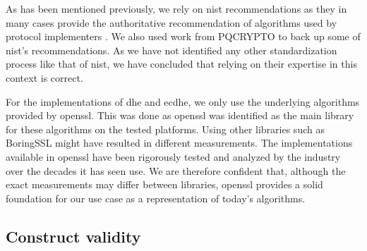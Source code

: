 As has been mentioned previously, we rely on \gls{nist} recommendations as they in many cases provide the authoritative recommendation of algorithms used by protocol implementers \cite{nist:round-three-submissions, nist2019}. We also used work from PQCRYPTO \cite{eu2015} to back up some of \gls{nist}'s recommendations. As we have not identified any other standardization process like that of \gls{nist}, we have concluded that relying on their expertise in this context is correct.

For the implementations of \gls{dhe} and \gls{ecdhe}, we only use the underlying algorithms provided by \gls{openssl}. This was done as \gls{openssl} was identified as the main library for these algorithms on the tested platforms. Using other libraries such as BoringSSL might have resulted in different measurements. The implementations available in \gls{openssl} have been rigorously tested and analyzed by the industry over the decades it has seen use. We are therefore confident that, although the exact measurements may differ between libraries, \gls{openssl} provides a solid foundation for our use case as a representation of today's algorithms.



\subsection{Construct validity}

